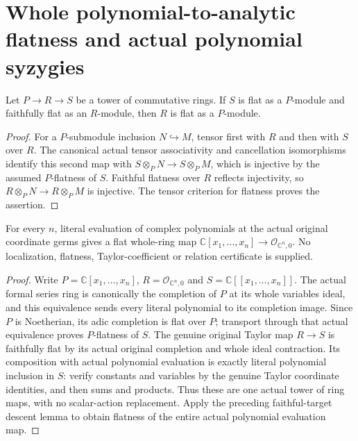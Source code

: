 \section{Whole polynomial-to-analytic flatness and actual polynomial syzygies}

\begin{lemma}
\label{hir:actual-flatness-faithful-target-descent}
\leanok
Let $P\to R\to S$ be a tower of commutative rings. If $S$ is flat as
a $P$-module and faithfully flat as an $R$-module, then $R$ is flat
as a $P$-module.
\end{lemma}
\begin{proof}
For a $P$-submodule inclusion $N\hookrightarrow M$, tensor first with
$R$ and then with $S$ over $R$. The canonical actual tensor
associativity and cancellation isomorphisms identify this second map
with $S\otimes_P N\to S\otimes_P M$, which is injective by the
assumed $P$-flatness of $S$. Faithful flatness over $R$ reflects
injectivity, so $R\otimes_P N\to R\otimes_P M$ is injective.
The tensor criterion for flatness proves the assertion.
\end{proof}

\begin{theorem}
\label{hir:actual-original-polynomial-analytic-flatness}
\leanok
For every $n$, literal evaluation of complex polynomials at the actual
original coordinate germs gives a flat whole-ring map
$\mathbb C[x_1,\ldots,x_n]\to\mathcal O_{\mathbb C^n,0}$.
No localization, flatness, Taylor-coefficient or relation certificate
is supplied.
\end{theorem}
\begin{proof}
Write $P=\mathbb C[x_1,\ldots,x_n]$, $R=\mathcal O_{\mathbb C^n,0}$
and $S=\mathbb C[[x_1,\ldots,x_n]]$. The actual formal series ring is
canonically the completion of $P$ at its whole variables ideal, and
this equivalence sends every literal polynomial to its completion
image. Since $P$ is Noetherian, its adic completion is flat over $P$;
transport through that actual equivalence proves $P$-flatness of $S$.
The genuine original Taylor map $R\to S$ is faithfully flat by its
actual original completion and whole ideal contraction. Its composition
with actual polynomial evaluation is exactly literal polynomial
inclusion in $S$: verify constants and variables by the genuine Taylor
coordinate identities, and then sums and products. Thus these are one
actual tower of ring maps, with no scalar-action replacement. Apply the
preceding faithful-target descent lemma to obtain flatness of the
entire actual polynomial evaluation map.
\end{proof}

